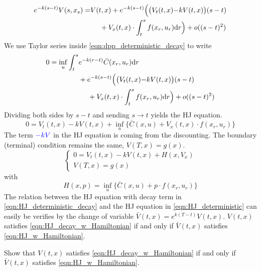 \documentclass[11pt]{book}
\newcommand{\dr}{\text{\normalfont d}r}
\begin{document}
    \[
        \begin{split}
             {e^{-k(s-t)}}V(s,x_s) = &V(t,x) + {e^{-k(s-t)}}\Big(\big(V_t(t,x) {- k V(t,x)}\big)(s-t)\\
             &~~~~+ V_x(t,x)\cdot\int_t^s f(x_r,u_r)\dr\Big) + o((s-t)^2)
        \end{split}
        \]
       We use Taylor series inside \eqref{eqn:dpp_deterministic_decay} to write
        \[
        \begin{split}
            0=\inf_{u}\int_t^s &{e^{-k(r-t)}}\bar{C}(x_r,u_r)\dr \\
            &+  {e^{-k(s-t)}}\Big(\big(V_t(t,x) {- k V(t,x)}\big)(s-t)\\
             &~~~~+ V_x(t,x)\cdot\int_t^s f(x_r,u_r)\dr\Big) + o((s-t)^2)
        \end{split}
        \]
        Dividing both sides by $s-t$ and sending $s\to t$ yields the HJ equation.
        \begin{equation}
            \label{eqn:HJ_deterministic_decay}
            0=V_t(t,x) - k V(t,x)+\inf_{u}\Big\{\bar{C}(x,u) + V_x(t,x)\cdot f(x_r,u_r)\Big\}
        \end{equation}
        The term ${\color{blue}-kV}$ in the HJ equation is coming from the discounting. 
        The boundary (terminal) condition remains the same, $V(T,x)=g(x)$. 
        \begin{equation}
        \label{eqn:HJ_decay_w_Hamiltonian}
            \begin{cases}
                0=V_t(t,x) - k V(t,x)+H(x,V_x)\\
                V(T,x)=g(x)
            \end{cases}
        \end{equation}
        with
        \[
        H(x,p)=\inf_{u}\Big\{\bar{C}(x,u) + p\cdot f(x_r,u_r)\Big\}
        \]
        The relation between the HJ equation with decay term in \eqref{eqn:HJ_deterministic_decay} and the HJ equation in \eqref{eqn:HJ_deterministic} can easily be verifies by the change of variable $\bar{V}(t,x)=e^{k(T-t)}V(t,x)$. $V(t,x)$ satisfies \eqref{eqn:HJ_decay_w_Hamiltonian} if and only if $\bar{V}(t,x)$ satisfies \eqref{eqn:HJ_w_Hamiltonian}. 
        \begin{ex}
            Show that $V(t,x)$ satisfies \eqref{eqn:HJ_decay_w_Hamiltonian} if and only if $\bar{V}(t,x)$ satisfies \eqref{eqn:HJ_w_Hamiltonian}. 
        \end{ex}
    
\end{document}
